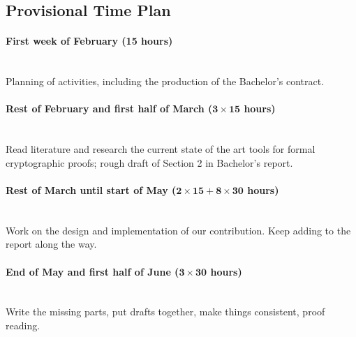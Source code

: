 \documentclass{article}
\newcommand{\timeest}[1]{$\mathbf{#1}$}%
\begin{document}
\subsection*{Provisional Time Plan}

\paragraph{First week of February (15 hours)}~\\\noindent
Planning of activities, including the production of the Bachelor's contract.

\paragraph{Rest of February and first half of March (\timeest{3\times 15} hours)}~\\\noindent
Read literature and research the current state of the art tools for formal
cryptographic proofs; rough draft of Section 2 in Bachelor's report.

\paragraph{Rest of March until start of May (\timeest{2\times 15+8\times 30} hours)}~\\\noindent
Work on the design and implementation of our contribution. Keep adding to the report
along the way. 

\paragraph{End of May and first half of June (\timeest{3\times 30} hours)}~\\\noindent
Write the missing parts, put drafts together, make things consistent, proof reading.
\end{document}
